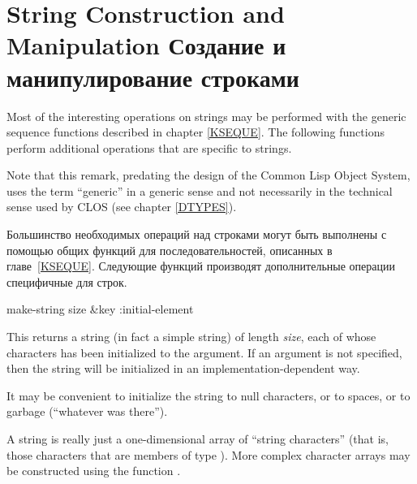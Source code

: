 \section{String Construction and Manipulation Создание и манипулирование строками}

Most of the interesting operations on strings may be performed
with the generic sequence functions described in chapter \ref{KSEQUE}.
The following functions perform additional operations that are specific
to strings.
\begin{new}
Note that this remark, predating the design of the Common Lisp Object System,
uses the term ``generic'' in a generic sense and not necessarily
in the technical sense used by CLOS
(see chapter \ref{DTYPES}).
\end{new}

Большинство необходимых операций над строками могут быть выполнены с помощью
общих функций для последовательностей, описанных в главе~\ref{KSEQUE}.
Следующие функций производят дополнительные операции специфичные для строк.

\begin{obsolete}
\begin{defun}[Function]
make-string size &key :initial-element

This returns a string (in fact a simple string)
of length \emph{size}, each of whose characters
has been initialized to the  argument.
If an  argument is not specified, then the string will
be initialized in an implementation-dependent way.

\beforenoterule
\begin{implementation}
It may be convenient to initialize the string
to null characters, or to spaces, or to garbage (``whatever was there'').
\end{implementation}
\afternoterule

A string is really just a one-dimensional array of ``string
characters'' (that is, those characters that are members of type
).  More complex character arrays may be constructed using the
function .
\end{defun}
\end{obsolete}

